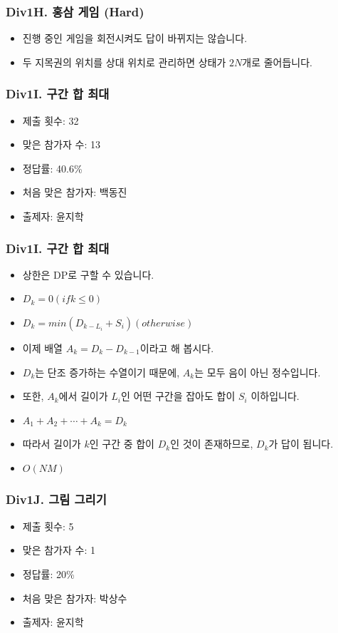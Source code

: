 \documentclass[xetex]{beamer}
\begin{document}
\begin{frame}
  \frametitle{Div1H. 홍삼 게임 (Hard)}
  \begin{itemize}
    \item 진행 중인 게임을 회전시켜도 답이 바뀌지는 않습니다.
    \item 두 지목권의 위치를 상대 위치로 관리하면 상태가 $2N$개로 줄어듭니다.
  \end{itemize}
\end{frame}

\begin{frame}
  \frametitle{Div1I. 구간 합 최대}
  \begin{itemize}
    \item 제출 횟수: 32
    \item 맞은 참가자 수: 13
    \item 정답률: 40.6\%
    \item 처음 맞은 참가자: 백동진
    \item 출제자: 윤지학
  \end{itemize}
\end{frame}

\begin{frame}
  \frametitle{Div1I. 구간 합 최대}
  \begin{itemize}
    \item 상한은 DP로 구할 수 있습니다.
    \item $D_k = 0 (if k \le 0)$
    \item $D_k = min ( D_{k - L_i} + S_i ) (otherwise)$
    \item 이제 배열 $A_k = D_k - D_{k - 1}$이라고 해 봅시다.
    \item $D_k$는 단조 증가하는 수열이기 때문에, $A_k$는 모두 음이 아닌 정수입니다.
    \item 또한, $A_k$에서 길이가 $L_i$인 어떤 구간을 잡아도 합이 $S_i$ 이하입니다.
    \item $A_1 + A_2 + \cdots + A_k = D_k$
    \item 따라서 길이가 $k$인 구간 중 합이 $D_k$인 것이 존재하므로, $D_k$가 답이 됩니다.
    \item $O(NM)$
  \end{itemize}
\end{frame}

\begin{frame}
  \frametitle{Div1J. 그림 그리기}
  \begin{itemize}
    \item 제출 횟수: 5
    \item 맞은 참가자 수: 1
    \item 정답률: 20\%
    \item 처음 맞은 참가자: 박상수
    \item 출제자: 윤지학
  \end{itemize}
\end{frame}
\end{document}
